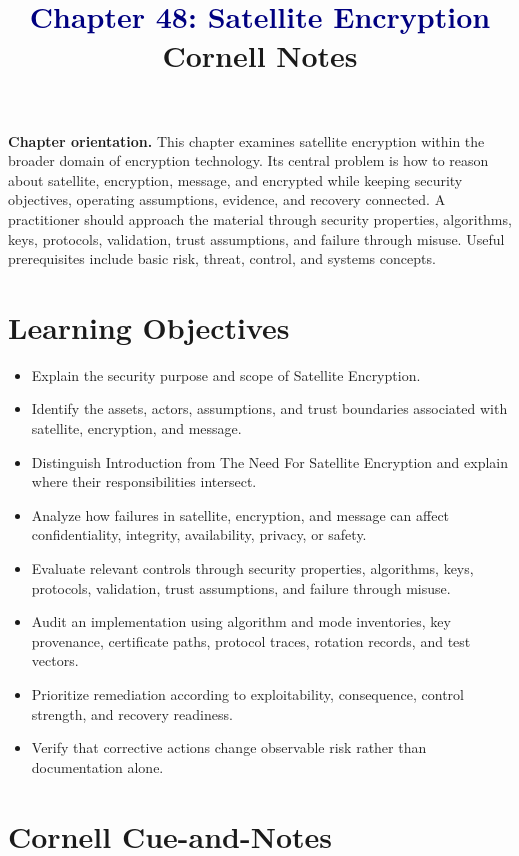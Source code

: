 \documentclass[11pt]{article}
\title{\textcolor{Navy}{Chapter 48: Satellite Encryption}\\[2mm]\large Cornell Notes}
\author{}
\date{}
\begin{document}
\maketitle
\thispagestyle{fancy}
\vspace{-1.5em}
\begin{orientationbox}
\textbf{Chapter orientation.} This chapter examines satellite encryption within the broader domain of encryption technology. Its central problem is how to reason about satellite, encryption, message, and encrypted while keeping security objectives, operating assumptions, evidence, and recovery connected. A practitioner should approach the material through security properties, algorithms, keys, protocols, validation, trust assumptions, and failure through misuse. Useful prerequisites include basic risk, threat, control, and systems concepts.
\end{orientationbox}
\section*{Learning Objectives}
\begin{itemize}
\item Explain the security purpose and scope of Satellite Encryption.
\item Identify the assets, actors, assumptions, and trust boundaries associated with satellite, encryption, and message.
\item Distinguish Introduction from The Need For Satellite Encryption and explain where their responsibilities intersect.
\item Analyze how failures in satellite, encryption, and message can affect confidentiality, integrity, availability, privacy, or safety.
\item Evaluate relevant controls through security properties, algorithms, keys, protocols, validation, trust assumptions, and failure through misuse.
\item Audit an implementation using algorithm and mode inventories, key provenance, certificate paths, protocol traces, rotation records, and test vectors.
\item Prioritize remediation according to exploitability, consequence, control strength, and recovery readiness.
\item Verify that corrective actions change observable risk rather than documentation alone.
\end{itemize}
\section*{Cornell Cue-and-Notes}
\end{document}
